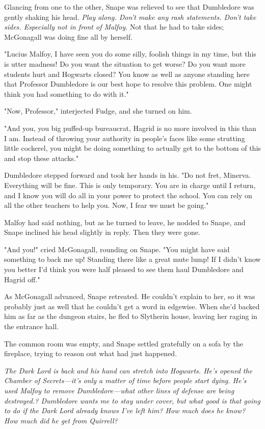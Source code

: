 Glancing from one to the other, Snape was relieved to see that Dumbledore was gently shaking his head. \emph{Play along. Don't make any rash statements. Don't take sides. Especially not in front of Malfoy.} Not that he had to take sides; McGonagall was doing fine all by herself.

"Lucius Malfoy, I have seen you do some silly, foolish things in my time, but this is utter madness! Do you want the situation to get worse? Do you want more students hurt and Hogwarts closed? You know as well as anyone standing here that Professor Dumbledore is our best hope to resolve this problem. One might think you had something to do with it."

"Now, Professor," interjected Fudge, and she turned on him.

"And you, you big puffed-up bureaucrat, Hagrid is no more involved in this than I am. Instead of throwing your authority in people's faces like some strutting little cockerel, you might be doing something to actually get to the bottom of this and stop these attacks."

Dumbledore stepped forward and took her hands in his. "Do not fret, Minerva. Everything will be fine. This is only temporary. You are in charge until I return, and I know you will do all in your power to protect the school. You can rely on all the other teachers to help you. Now, I fear we must be going."

Malfoy had said nothing, but as he turned to leave, he nodded to Snape, and Snape inclined his head slightly in reply. Then they were gone.

"And you!" cried McGonagall, rounding on Snape. "You might have said something to back me up! Standing there like a great mute lump! If I didn't know you better I'd think you were half pleased to see them haul Dumbledore and Hagrid off."

As McGonagall advanced, Snape retreated. He couldn't explain to her, so it was probably just as well that he couldn't get a word in edgewise. When she'd backed him as far as the dungeon stairs, he fled to Slytherin house, leaving her raging in the entrance hall.

The common room was empty, and Snape settled gratefully on a sofa by the fireplace, trying to reason out what had just happened.

\emph{The Dark Lord is back and his hand can stretch into Hogwarts. He's opened the Chamber of Secrets—it's only a matter of time before people start dying. He's used Malfoy to remove Dumbledore—what other lines of defense are being destroyed.? Dumbledore wants me to stay under cover, but what good is that going to do if the Dark Lord already knows I've left him? How much does he know? How much did he get from Quirrell?}

